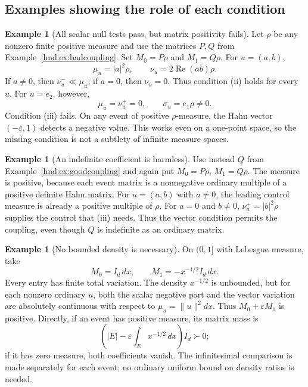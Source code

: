\documentclass[11pt,oneside]{article}
\theoremstyle{definition}
\newtheorem{example}[theorem]{Example}
\theoremstyle{remark}
\newcommand{\eps}{\varepsilon}
\begin{document}
\subsection{Examples showing the role of each condition}

\begin{example}[All scalar null tests pass, but matrix positivity fails]
\label{hnd:ex:measurebad}
Let $\rho$ be any nonzero finite positive measure and use the matrices
$P,Q$ from Example~\ref{hnd:ex:badcoupling}. Set $M_0=P\rho$ and
$M_1=Q\rho$. For $u=(a,b)$,
\[
 \mu_u=|a|^2\rho,\qquad
 \nu_u=2\operatorname{Re}(\bar a b)\rho.
\]
If $a\ne0$, then $\nu_u^-\ll\mu_u$; if $a=0$, then $\nu_u=0$.
Thus condition (ii) holds for every $u$.
For $u=e_2$, however,
\[
 \mu_u=\nu_u^+=0,
 \qquad \sigma_u=e_1\rho\ne0.
\]
Condition (iii) fails. On any event of positive $\rho$-measure, the
Hahn vector $(-\eps,1)$ detects a negative value.
This works even on a one-point space, so the missing condition is not a
subtlety of infinite measure spaces.
\end{example}

\begin{example}[An indefinite coefficient is harmless]
Use instead $Q$ from Example~\ref{hnd:ex:goodcoupling} and again put
$M_0=P\rho$, $M_1=Q\rho$. The measure is positive, because each event
matrix is a nonnegative ordinary multiple of a positive definite
Hahn matrix. For $u=(a,b)$ with $a\ne0$, the leading control measure is
already a positive multiple of $\rho$. For $a=0$ and $b\ne0$,
$\nu_u^+=|b|^2\rho$ supplies the control that (iii) needs.
Thus the vector condition permits the coupling, even though $Q$ is
indefinite as an ordinary matrix.
\end{example}

\begin{example}[No bounded density is necessary]\label{hnd:ex:unboundeddensity}
On $(0,1]$ with Lebesgue measure, take
\[
 M_0=I_d\,dx,\qquad
 M_1=-x^{-1/2}I_d\,dx.
\]
Every entry has finite total variation. The density $x^{-1/2}$ is
unbounded, but for each nonzero ordinary $u$, both the scalar negative
part and the vector variation are absolutely continuous with respect
to $\mu_u=\|u\|^2dx$.
Thus $M_0+\eps M_1$ is positive.
Directly, if an event has positive measure, its matrix mass is
\[
 \left(|E|-\eps\int_E x^{-1/2}\,dx\right)I_d\succ0;
\]
if it has zero measure, both coefficients vanish. The infinitesimal
comparison is made separately for each event; no ordinary uniform bound
on density ratios is needed.
\end{example}
\end{document}
